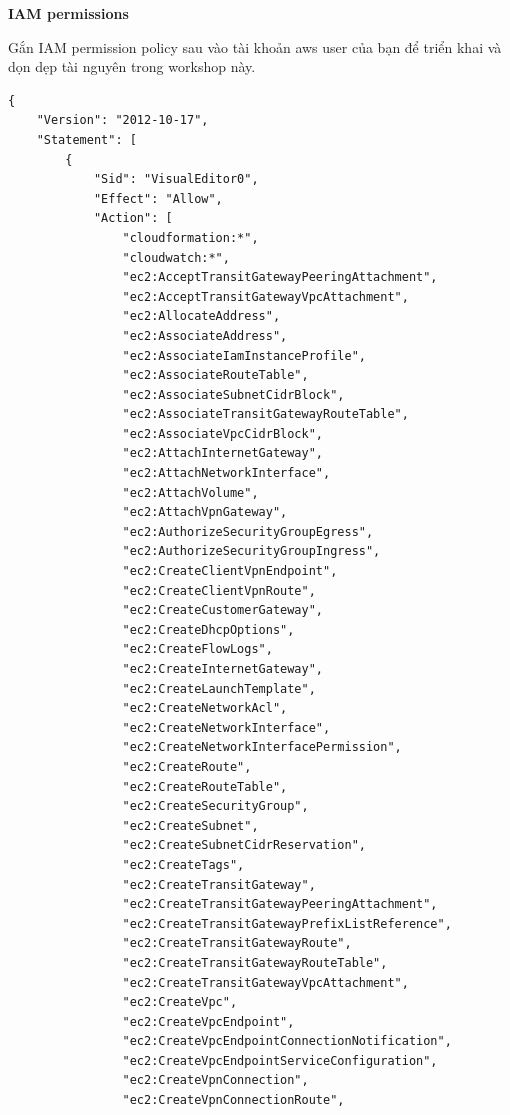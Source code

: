 \vspace{0.5em}\noindent\textbf{IAM permissions}\par

Gắn IAM permission policy sau vào tài khoản aws user của bạn để triển
khai và dọn dẹp tài nguyên trong workshop này.

\begin{verbatim}
{
    "Version": "2012-10-17",
    "Statement": [
        {
            "Sid": "VisualEditor0",
            "Effect": "Allow",
            "Action": [
                "cloudformation:*",
                "cloudwatch:*",
                "ec2:AcceptTransitGatewayPeeringAttachment",
                "ec2:AcceptTransitGatewayVpcAttachment",
                "ec2:AllocateAddress",
                "ec2:AssociateAddress",
                "ec2:AssociateIamInstanceProfile",
                "ec2:AssociateRouteTable",
                "ec2:AssociateSubnetCidrBlock",
                "ec2:AssociateTransitGatewayRouteTable",
                "ec2:AssociateVpcCidrBlock",
                "ec2:AttachInternetGateway",
                "ec2:AttachNetworkInterface",
                "ec2:AttachVolume",
                "ec2:AttachVpnGateway",
                "ec2:AuthorizeSecurityGroupEgress",
                "ec2:AuthorizeSecurityGroupIngress",
                "ec2:CreateClientVpnEndpoint",
                "ec2:CreateClientVpnRoute",
                "ec2:CreateCustomerGateway",
                "ec2:CreateDhcpOptions",
                "ec2:CreateFlowLogs",
                "ec2:CreateInternetGateway",
                "ec2:CreateLaunchTemplate",
                "ec2:CreateNetworkAcl",
                "ec2:CreateNetworkInterface",
                "ec2:CreateNetworkInterfacePermission",
                "ec2:CreateRoute",
                "ec2:CreateRouteTable",
                "ec2:CreateSecurityGroup",
                "ec2:CreateSubnet",
                "ec2:CreateSubnetCidrReservation",
                "ec2:CreateTags",
                "ec2:CreateTransitGateway",
                "ec2:CreateTransitGatewayPeeringAttachment",
                "ec2:CreateTransitGatewayPrefixListReference",
                "ec2:CreateTransitGatewayRoute",
                "ec2:CreateTransitGatewayRouteTable",
                "ec2:CreateTransitGatewayVpcAttachment",
                "ec2:CreateVpc",
                "ec2:CreateVpcEndpoint",
                "ec2:CreateVpcEndpointConnectionNotification",
                "ec2:CreateVpcEndpointServiceConfiguration",
                "ec2:CreateVpnConnection",
                "ec2:CreateVpnConnectionRoute",

\end{verbatim}
